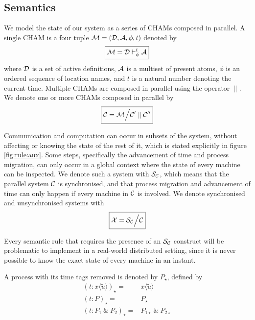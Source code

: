 \subsection{Semantics}

We model the state of our system as a series of CHAMs composed in parallel. A
single CHAM is a four tuple $\mathcal{M} = (\mathcal{D}, \mathcal{A}, \phi, t)$ denoted by
\begin{equation*}
 \boxed{\mathcal{M} = \mathcal{D} \vdash^{t}_{\phi} \mathcal{A}}
\end{equation*}
where $\mathcal{D}$ is a set of active definitions, $\mathcal{A}$ is a multiset
of present atoms, $\phi$ is an ordered sequence of location names, and $t$ is
a natural number denoting the current time. Multiple CHAMs are composed in
parallel using the operator $\parallel$. We denote one or more CHAMs composed
in parallel by
\begin{equation*}
 \boxed{\mathcal{C} = \mathcal{M} \Big\slash \mathcal{C}'\parallel\mathcal{C}''}
\end{equation*}

Communication and computation can occur in subsets of the system, without
affecting or knowing the state of the rest of it, which is stated explicitly in
figure \ref{fig:rule:aux}. Some steps, specifically the advancement of time and
process migration, can only occur in a global context where the state of every
machine can be inspected. We denote such a system with $\mathcal{S}_{\mathcal{C}}$, which means
that the parallel system $\mathcal{C}$ is synchronised, and that process migration and
advancement of time can only happen if every machine in $\mathcal{C}$ is involved. We
denote synchronised and unsynchronised systems with
\begin{equation*}
 \boxed{\mathcal{X} = \mathcal{S}_{\mathcal{C}} \Big\slash \mathcal{C}}
\end{equation*}

Every semantic rule that requires the presence of an $\mathcal{S}_{\mathcal{C}}$ construct will be
problematic to implement in a real-world distributed setting, since it is never
possible to know the exact state of every machine in an instant.

A process with its time tags removed is denoted by $P_{\star}$, defined by
\begin{align*}
  (t : x\langle \tilde u \rangle)_\star ={}& x\langle \tilde u \rangle \\
  (t : P)_\star ={}& P_\star \\
  (t : P_1~\&~P_2)_\star ={}& P_{1\star} ~\&~ P_{2\star}
\end{align*}

